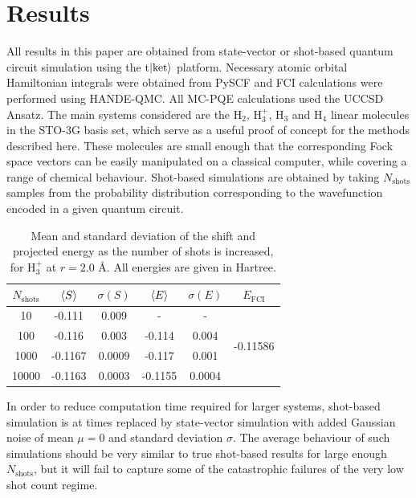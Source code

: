 \documentclass[%
 reprint,
 amsmath,amssymb,
 aps,
]{revtex4-2}
\begin{document}
{\section{Results}\label{sec:res}
All results in this paper are obtained from state-vector or shot-based quantum circuit simulation using the t$\ket{\mathrm{ket}}$ platform.\cite{Sivarajah2021} Necessary atomic orbital Hamiltonian integrals were obtained from PySCF\cite{Sun2020} and FCI calculations were performed using HANDE-QMC.\cite{Spencer2019} All MC-PQE calculations used the UCCSD Ansatz. The main systems considered are the H$_2$, H$_3^+$, H$_3$ and H$_4$ linear molecules in the STO-3G basis set,\cite{Hehre1969} which serve as a useful proof of concept for the methods described here. These molecules are small enough that the corresponding Fock space vectors can be easily manipulated on a classical computer, while covering a range of chemical behaviour. Shot-based simulations are obtained by taking $N_\mathrm{shots}$ samples from the probability distribution corresponding to the wavefunction encoded in a given quantum circuit. 
\begin{table}
    \centering
    \caption{\small \justifying Mean and standard deviation of the shift and projected energy as the number of shots is increased, for H$_3^+$ at $r = 2.0$ \r{A}. {All energies are given in Hartree.}}
    \label{tab:variance}
    \begin{tabular}{c|c|c|c|c|c}
       $N_\mathrm{shots}$  &  $\braket{S}$ & $\sigma (S)$ & $\braket{E}$ & $\sigma(E)$&$E_\mathrm{FCI}$\\
       \hline
         10 & -0.111 & 0.009 & - & - &\multirow{4}{*}{-0.11586}\\
         100 & -0.116& 0.003& -0.114& 0.004& \\
         1000 & -0.1167& 0.0009 & -0.117& 0.001& \\
         10000 & -0.1163 & 0.0003& -0.1155 & 0.0004& \\
         \hline
    \end{tabular}

\end{table}
In order to reduce computation time required for larger systems, shot-based simulation is at times replaced by state-vector simulation with added Gaussian noise of mean $\mu = 0$ and standard deviation $\sigma$. The average behaviour of such simulations should be very similar to true shot-based results for large enough $N_\mathrm{shots}$, but it will fail to capture some of the catastrophic failures of the very low shot count regime.

}
\end{document}
